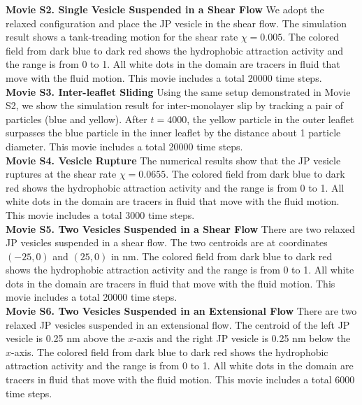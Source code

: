\noindent
{\bf Movie S2. Single Vesicle Suspended in a Shear Flow} 
We adopt the relaxed configuration and place the JP vesicle in the shear flow. The simulation result shows a tank-treading motion for the shear rate $\chi=0.005$.
The colored field from dark blue to dark red shows the hydrophobic attraction activity and the range is from 0 to 1. All white dots in the domain are tracers in fluid that move with the fluid motion.
This movie includes a total 20000 time steps. \\

\noindent
{\bf Movie S3. Inter-leaflet Sliding} 
Using the same setup demonstrated in Movie S2, we show the simulation result for 
inter-monolayer slip by tracking a pair of particles (blue and yellow). After $t=4000$, 
the yellow particle in the outer leaflet surpasses the blue particle in the inner leaflet by the distance about 1 particle diameter.
This movie includes a total 20000 time steps.\\


\noindent
{\bf Movie S4. Vesicle Rupture} 
The numerical results show that the JP vesicle ruptures at the shear rate $\chi=0.0655$. The colored field from dark blue to dark red shows the hydrophobic attraction activity and the range is from 0 to 1. All white dots in the domain are tracers in fluid that move with the fluid motion. This movie includes a total 3000 time steps.\\


\noindent
{\bf Movie S5. Two Vesicles Suspended in a Shear Flow} 
There are two relaxed JP vesicles suspended in a shear flow. The two centroids are at coordinates $(-25,0)$ and $(25,0)$ in nm. The colored field from dark blue to dark red shows the hydrophobic attraction activity and the range is from 0 to 1. All white dots in the domain are tracers in fluid that move with the fluid motion. This movie includes a total 20000 time steps.\\


\noindent
{\bf Movie S6. Two Vesicles Suspended in an Extensional Flow} 
There are two relaxed JP vesicles suspended in an extensional flow. The centroid of the left JP vesicle is 0.25 nm above the $x$-axis and the right JP vesicle is 0.25 nm below the $x$-axis. The colored field from dark blue to dark red shows the hydrophobic attraction activity and the range is from 0 to 1. All white dots in the domain are tracers in fluid that move with the fluid motion.
This movie includes a total 6000 time steps.



